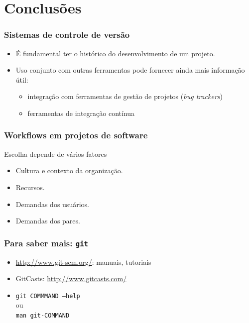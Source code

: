 \documentclass{beamer}
\newcommand{\git}{\texttt{git}}
\begin{document}
\section{Conclusões}

\begin{frame}
  \frametitle{Sistemas de controle de versão}
  \begin{itemize}
    \item É fundamental ter o histórico do desenvolvimento de um
      projeto.
    \item Uso conjunto com outras ferramentas pode fornecer ainda mais
      informação útil:
      \begin{itemize}
        \item integração com ferramentas de gestão de projetos (\emph{bug
          trackers})
        \item ferramentas de integração contínua
      \end{itemize}
  \end{itemize}
\end{frame}

\begin{frame}
  \frametitle{Workflows em projetos de software}
  Escolha depende de vários fatores
  \begin{itemize}
    \item<2-> Cultura e contexto da organização.
    \item<3-> Recursos.
    \item<4-> Demandas dos usuários.
    \item<5-> Demandas dos pares.
  \end{itemize}
\end{frame}

\begin{frame}
  \frametitle{Para saber mais: \git}
  \begin{itemize}
    \item \url{http://www.git-scm.org/}: manuais, tutoriais
    \item GitCasts: \url{http://www.gitcasts.com/}
    \item \texttt{git COMMMAND --help}\\
      ou\\
      \texttt{man git-COMMAND}
  \end{itemize}
\end{frame}
\end{document}
